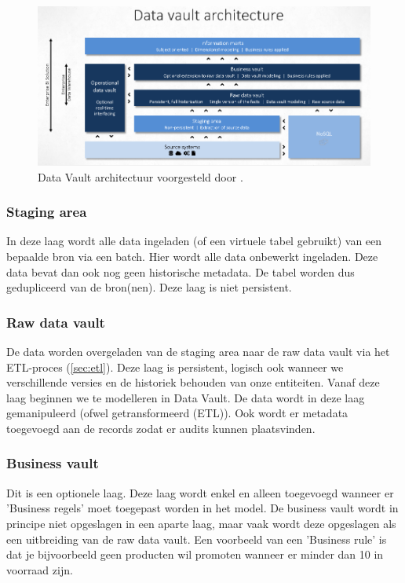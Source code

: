 \begin{figure}[h]
	\includegraphics[scale=0.63]{../images/DVArchitectuur.png}
	\caption{Data Vault architectuur voorgesteld door \textcite{Stroobants2018}.}
	\label{fig:dvarcht}
\end{figure}

\subsubsection{Staging area}
In deze laag wordt alle data ingeladen (of een virtuele tabel gebruikt) van een bepaalde bron via een batch. Hier wordt alle data onbewerkt ingeladen. Deze data bevat dan ook nog geen historische metadata. De tabel worden dus gedupliceerd van de bron(nen). Deze laag is niet persistent.

\subsubsection{Raw data vault}
De data worden overgeladen van de staging area naar de raw data vault via het ETL-proces (\ref{sec:etl}). Deze laag is persistent, logisch ook wanneer we verschillende versies en de historiek behouden van onze entiteiten. Vanaf deze laag beginnen we te modelleren in Data Vault. De data wordt in deze laag gemanipuleerd (ofwel getransformeerd (ETL)). Ook wordt er metadata toegevoegd aan de records zodat er audits kunnen plaatsvinden. 

\subsubsection{Business vault}
Dit is een optionele laag. Deze laag wordt enkel en alleen toegevoegd wanneer er 'Business regels' moet toegepast worden in het model. De business vault wordt in principe niet opgeslagen in een aparte laag, maar vaak wordt deze opgeslagen als een uitbreiding van de raw data vault. Een voorbeeld van een 'Business rule' is dat je bijvoorbeeld geen producten wil promoten wanneer er minder dan 10 in voorraad zijn.

